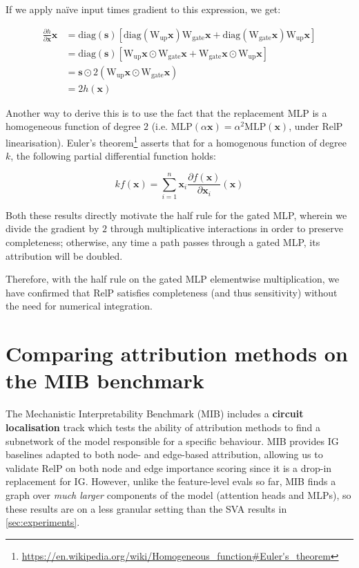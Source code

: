 \documentclass{article}
\theoremstyle{plain}
\theoremstyle{definition}
\theoremstyle{remark}
\begin{document}
If we apply naïve input times gradient to this expression, we get:

\begin{align}
\frac{\partial h}{\partial \mathbf{x}}\mathbf{x} &= \mathrm{diag}(\mathbf{s}) [\mathrm{diag}(\mathrm{W}_\text{up}\mathbf{x}) \mathrm{W}_\text{gate}\mathbf{x} + \mathrm{diag}(\mathrm{W}_\text{gate}\mathbf{x}) \mathrm{W}_\text{up}\mathbf{x} ]\\
&= \mathrm{diag}(\mathbf{s}) [\mathrm{W}_\text{up}\mathbf{x} \odot \mathrm{W}_\text{gate}\mathbf{x} + \mathrm{W}_\text{gate}\mathbf{x} \odot \mathrm{W}_\text{up}\mathbf{x} ]\\
&= \mathbf{s} \odot 2 (\mathrm{W}_\text{up}\mathbf{x} \odot \mathrm{W}_\text{gate}\mathbf{x})\\
&= 2 h(\mathbf{x})
\end{align}

Another way to derive this is to use the fact that the replacement MLP is a homogeneous function of degree $2$ (i.e. $\mathrm{MLP}(\alpha\mathbf{x}) = \alpha^2\mathrm{MLP}(\mathbf{x})$, under RelP linearisation). Euler's theorem\footnote{\url{https://en.wikipedia.org/wiki/Homogeneous\_function\#Euler's\_theorem}} asserts that for a homogenous function of degree $k$, the following partial differential function holds:

\begin{equation}kf(\mathbf{x}) = \sum_{i=1}^n\mathbf{x}_i\frac{\partial f(\mathbf{x})}{\partial \mathbf{x}_i}(\mathbf{x})\end{equation}

Both these results directly motivate the half rule for the gated MLP, wherein we divide the gradient by $2$ through multiplicative interactions in order to preserve completeness; otherwise, any time a path passes through a gated MLP, its attribution will be doubled.

Therefore, with the half rule on the gated MLP elementwise multiplication, we have confirmed that RelP satisfies completeness (and thus sensitivity) without the need for numerical integration.

\newpage
\section{Comparing attribution methods on the MIB benchmark}
\label{sec:mib}

The Mechanistic Interpretability Benchmark (MIB) \citep{mueller2025mib} includes a \textbf{circuit localisation} track which tests the ability of attribution methods to find a subnetwork of the model responsible for a specific behaviour. MIB provides IG baselines adapted to both node- and edge-based attribution, allowing us to validate RelP on both node and edge importance scoring since it is a drop-in replacement for IG. However, unlike the feature-level evals so far, MIB finds a graph over \textit{much larger} components of the model (attention heads and MLPs), so these results are on a less granular setting than the SVA results in \cref{sec:experiments}.
\end{document}

